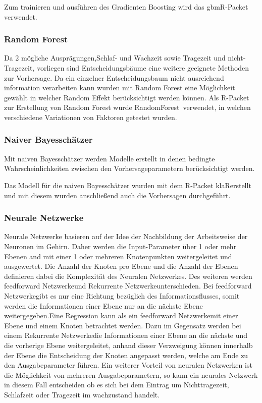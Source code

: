 Zum trainieren und ausführen des Gradienten Boosting wird das \glqq gbm\grqq R-Packet verwendet.



\subsubsection{Random Forest}
Da 2 mögliche Ausprägungen,Schlaf- und Wachzeit sowie Tragezeit und nicht-Tragezeit, vorliegen sind Entscheidungsbäume eine weitere geeignete Methoden zur Vorhersage. Da ein einzelner Entscheidungsbaum nicht ausreichend information verarbeiten kann wurden mit Random Forest eine Möglichkeit gewählt in welcher Random Effekt berücksichtigt werden können.
Als R-Packet zur Erstellung von Random Forest wurde \glqq RandomForest\grqq \ verwendet, in welchen verschiedene Variationen von Faktoren getestet wurden.



\subsubsection{Naiver Bayesschätzer}
Mit naiven Bayesschätzer werden Modelle erstellt in denen bedingte Wahrscheinlichkeiten zwischen den Vorhersageparametern berücksichtigt werden\cite{dummies}.

Das Modell für die naiven Bayesschätzer wurden mit dem R-Packet \glqq klaR\grqq erstellt und mit diesem wurden anschließend auch die Vorhersagen durchgeführt.



\subsubsection{Neurale Netzwerke}
Neurale Netzwerke basieren auf der Idee der Nachbildung der Arbeitsweise der Neuronen im Gehirn\cite{dummies}. Daher werden die Input-Parameter über 1 oder mehr Ebenen and mit einer 1 oder mehreren Knotenpunkten weitergeleitet und ausgewertet. Die Anzahl der Knoten pro Ebene und die Anzahl der Ebenen definieren dabei die Komplexität des Neuralen Netzwerkes.
Des weiteren werden \glqq feedforward Netzwerke\grqq und \glqq Rekurrente Netzwerke\grqq unterschieden\cite{dummies}. Bei \glqq feedforward Netzwerke\grqq gibt es nur eine Richtung bezüglich des Informationsflusses, somit werden die Informationen einer Ebene nur an die nächste Ebene weitergegeben\cite{dummies}.Eine Regression kann als ein \glqq feedforward Netzwerke\grqq mit einer Ebene und einem Knoten betrachtet werden. Dazu im Gegensatz werden bei einem \glqq Rekurrente Netzwerke\grqq die Informationen einer Ebene an die nächste und die vorherige Ebene weitergeleitet, anhand dieser Verzweigung können innerhalb der Ebene die Entscheidung der Knoten angepasst werden, welche am Ende zu den Ausgabeparameter führen.
Ein weiterer Vorteil von neuralen Netzwerken ist die Möglichkeit von mehreren Ausgabeparametern\cite{dummies}, so kann ein neurales Netzwerk in diesem Fall entscheiden ob es sich bei dem Eintrag um Nichttragezeit, Schlafzeit oder Tragezeit im wachzustand handelt.

